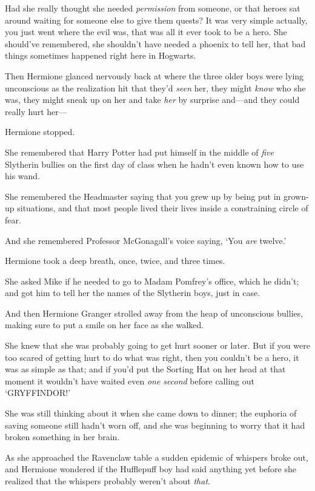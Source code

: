 Had she really thought she needed \emph{permission} from someone, or that heroes sat around waiting for someone else to give them quests? It was very simple actually, you just went where the evil was, that was all it ever took to be a hero. She should've remembered, she shouldn't have needed a phoenix to tell her, that bad things sometimes happened right here in Hogwarts.

Then Hermione glanced nervously back at where the three older boys were lying unconscious as the realization hit that they'd \emph{seen} her, they might \emph{know} who she was, they might sneak up on her and take \emph{her} by surprise and---and they could really hurt her---

Hermione stopped.

She remembered that Harry Potter had put himself in the middle of \emph{five} Slytherin bullies on the first day of class when he hadn't even known how to use his wand.

She remembered the Headmaster saying that you grew up by being put in grown-up situations, and that most people lived their lives inside a constraining circle of fear.

And she remembered Professor McGonagall's voice saying, `You \emph{are} twelve.'

Hermione took a deep breath, once, twice, and three times.

She asked Mike if he needed to go to Madam Pomfrey's office, which he didn't; and got him to tell her the names of the Slytherin boys, just in case.

And then Hermione Granger strolled away from the heap of unconscious bullies, making sure to put a smile on her face as she walked.

She knew that she was probably going to get hurt sooner or later. But if you were too scared of getting hurt to do what was right, then you couldn't be a hero, it was as simple as that; and if you'd put the Sorting Hat on her head at that moment it wouldn't have waited even \emph{one second} before calling out `GRYFFINDOR!'

\later

She was still thinking about it when she came down to dinner; the euphoria of saving someone still hadn't worn off, and she was beginning to worry that it had broken something in her brain.

As she approached the Ravenclaw table a sudden epidemic of whispers broke out, and Hermione wondered if the Hufflepuff boy had said anything yet before she realized that the whispers probably weren't about \emph{that}.

